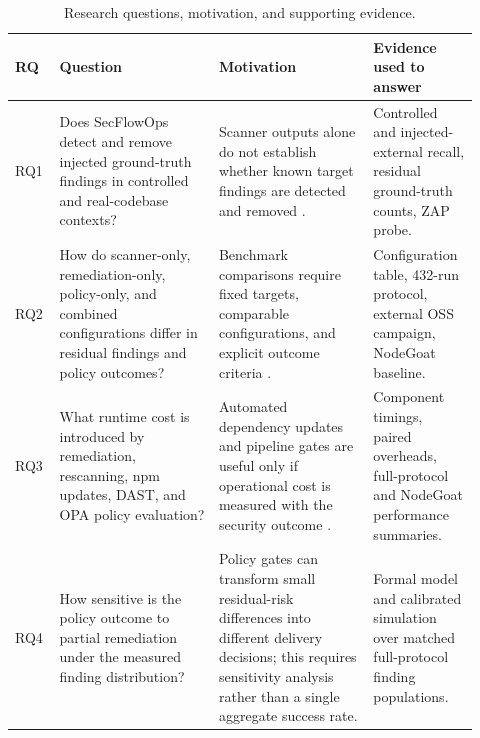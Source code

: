 \begin{table}[t]
\centering
\footnotesize
\caption{Research questions, motivation, and supporting evidence.}
\label{tab:rq}
\begin{tabular}{@{}p{0.08\linewidth}p{0.32\linewidth}p{0.31\linewidth}p{0.21\linewidth}@{}}
\toprule
RQ & Question & Motivation & Evidence used to answer \\
\midrule
RQ1 & Does SecFlowOps detect and remove injected ground-truth findings in controlled and real-codebase contexts? & Scanner outputs alone do not establish whether known target findings are detected and removed \cite{johnsonStaticAnalysis2013,bellerStaticAnalysis2016}. & Controlled and injected-external recall, residual ground-truth counts, ZAP probe. \\
RQ2 & How do scanner-only, remediation-only, policy-only, and combined configurations differ in residual findings and policy outcomes? & Benchmark comparisons require fixed targets, comparable configurations, and explicit outcome criteria \cite{pariziBenchmark2018}. & Configuration table, 432-run protocol, external OSS campaign, NodeGoat baseline. \\
RQ3 & What runtime cost is introduced by remediation, rescanning, npm updates, DAST, and OPA policy evaluation? & Automated dependency updates and pipeline gates are useful only if operational cost is measured with the security outcome \cite{decanNpm2018,mirhosseiniPullRequests2017}. & Component timings, paired overheads, full-protocol and NodeGoat performance summaries. \\
RQ4 & How sensitive is the policy outcome to partial remediation under the measured finding distribution? & Policy gates can transform small residual-risk differences into different delivery decisions; this requires sensitivity analysis rather than a single aggregate success rate. & Formal model and calibrated simulation over matched full-protocol finding populations. \\
\bottomrule
\end{tabular}
\end{table}

